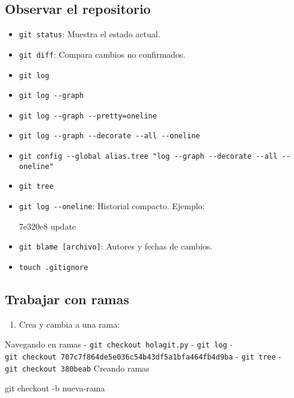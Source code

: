 \documentclass[
  doc,
  floatsintext,
  longtable,
  a4paper,
  nolmodern,
  notxfonts,
  notimes,
  colorlinks=true,linkcolor=blue,citecolor=blue,urlcolor=blue]{apa7}
\newenvironment{Shaded}{\begin{snugshade}}{\end{snugshade}}
\newcommand{\AttributeTok}[1]{\textcolor[rgb]{0.40,0.45,0.13}{#1}}
\newcommand{\ExtensionTok}[1]{\textcolor[rgb]{0.00,0.23,0.31}{#1}}
\newcommand{\FunctionTok}[1]{\textcolor[rgb]{0.28,0.35,0.67}{#1}}
\newcommand{\NormalTok}[1]{\textcolor[rgb]{0.00,0.23,0.31}{#1}}
\providecommand{\tightlist}{%
  \setlength{\itemsep}{0pt}\setlength{\parskip}{0pt}}
\begin{document}
\subsection{Observar el repositorio}\label{observar-el-repositorio}

\begin{itemize}
\item
  \texttt{git\ status}: Muestra el estado actual.
\item
  \texttt{git\ diff}: Compara cambios no confirmados.
\item
  \texttt{git\ log}
\item
  \texttt{git\ log\ -\/-graph}
\item
  \texttt{git\ log\ -\/-graph\ -\/-pretty=oneline}
\item
  \texttt{git\ log\ -\/-graph\ -\/-decorate\ -\/-all\ -\/-oneline}
\item
  \texttt{git\ config\ -\/-global\ alias.tree\ "log\ -\/-graph\ -\/-decorate\ -\/-all\ -\/-oneline"}
\item
  \texttt{git\ tree}
\item
  \texttt{git\ log\ -\/-oneline}: Historial compacto. Ejemplo:

\begin{Shaded}
\begin{Highlighting}[]
\ExtensionTok{7e320e8}\NormalTok{ update}
\end{Highlighting}
\end{Shaded}
\item
  \texttt{git\ blame\ {[}archivo{]}}: Autores y fechas de cambios.
\item
  \texttt{touch\ .gitignore}
\end{itemize}

\subsection{Trabajar con ramas}\label{trabajar-con-ramas}

\begin{enumerate}
\def\labelenumi{\arabic{enumi}.}
\tightlist
\item
  Crea y cambia a una rama:
\end{enumerate}

Navegando en ramas - \texttt{git\ checkout\ holagit.py} -
\texttt{git\ log} -
\texttt{git\ checkout\ 707c7f864de5e036c54b43df5a1bfa464fb4d9ba} -
\texttt{git\ tree} - \texttt{git\ checkout\ 380beab} Creando ramas

\begin{Shaded}
\begin{Highlighting}[]
\FunctionTok{git}\NormalTok{ checkout }\AttributeTok{{-}b}\NormalTok{ nueva{-}rama}
\end{Highlighting}
\end{Shaded}
\end{document}
